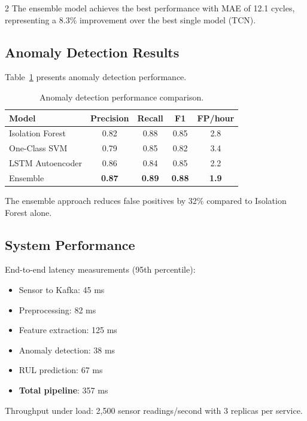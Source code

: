 \documentclass{ijceds} %
\begin{document}
\begin{multicols}{2}
The ensemble model achieves the best performance with MAE of 12.1 cycles, representing a 8.3\% improvement over the best single model (TCN).

\subsection{Anomaly Detection Results}

Table~\ref{tab:anomaly-results} presents anomaly detection performance.

\begin{table}[H]
\centering
\caption{Anomaly detection performance comparison.}
\label{tab:anomaly-results}
\scriptsize
\begin{tabular}{|l|c|c|c|c|}
\hline
\textbf{Model} & \textbf{Precision} & \textbf{Recall} & \textbf{F1} & \textbf{FP/hour} \\ \hline
Isolation Forest & 0.82 & 0.88 & 0.85 & 2.8 \\ \hline
One-Class SVM & 0.79 & 0.85 & 0.82 & 3.4 \\ \hline
LSTM Autoencoder & 0.86 & 0.84 & 0.85 & 2.2 \\ \hline
Ensemble & \textbf{0.87} & \textbf{0.89} & \textbf{0.88} & \textbf{1.9} \\ \hline
\end{tabular}
\end{table}

The ensemble approach reduces false positives by 32\% compared to Isolation Forest alone.

\subsection{System Performance}

End-to-end latency measurements (95th percentile):

\begin{itemize}
    \item Sensor to Kafka: 45 ms
    \item Preprocessing: 82 ms
    \item Feature extraction: 125 ms
    \item Anomaly detection: 38 ms
    \item RUL prediction: 67 ms
    \item \textbf{Total pipeline}: 357 ms
\end{itemize}

Throughput under load: 2,500 sensor readings/second with 3 replicas per service.


\end{multicols}
\end{document}
